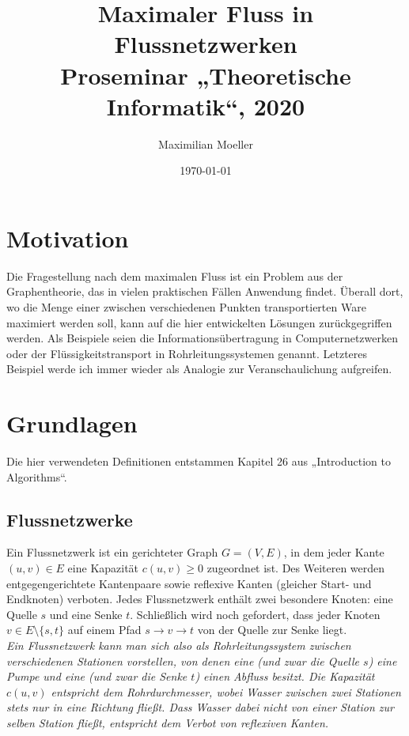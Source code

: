 \documentclass[journal]{IEEEtran}
\author{Maximilian Moeller}
\title{Maximaler Fluss in Flussnetzwerken\\
\large Proseminar „Theoretische Informatik“, 2020}
\date{\today}
\begin{document}
\maketitle

\section{Motivation}
Die Fragestellung nach dem maximalen Fluss ist ein Problem aus der Graphentheorie, das
in vielen praktischen Fällen Anwendung findet. Überall dort, wo die Menge einer zwischen verschiedenen Punkten transportierten Ware maximiert werden soll, kann auf die hier entwickelten Lösungen zurückgegriffen werden. Als Beispiele seien die Informationsübertragung in Computernetzwerken oder der Flüssigkeitstransport in Rohrleitungssystemen genannt. Letzteres Beispiel werde ich immer wieder als Analogie zur Veranschaulichung aufgreifen.

\section{Grundlagen}
Die hier verwendeten Definitionen entstammen Kapitel 26 aus „Introduction to Algorithms“\citep{Cormen09}.
\subsection{Flussnetzwerke}
Ein Flussnetzwerk ist ein gerichteter Graph $G = (V,E)$, in dem jeder Kante $(u,v) \in E$ eine Kapazität $c(u,v) \geq 0$ zugeordnet ist. Des Weiteren werden entgegengerichtete Kantenpaare sowie reflexive Kanten (gleicher Start- und Endknoten) verboten. Jedes Flussnetzwerk enthält zwei besondere Knoten: eine Quelle $s$ und eine Senke $t$. Schließlich wird noch gefordert, dass jeder Knoten $v \in E\setminus\{s,t\}$ auf einem Pfad $s\to v\to t$ von der Quelle zur Senke liegt.\\
\textit{Ein Flussnetzwerk kann man sich also als Rohrleitungssystem zwischen verschiedenen Stationen vorstellen, von denen eine (und zwar die Quelle $s$) eine Pumpe und eine (und zwar die Senke $t$) einen Abfluss besitzt.
Die Kapazität $c(u,v)$ entspricht dem Rohrdurchmesser, wobei Wasser zwischen zwei Stationen stets nur in eine Richtung fließt. Dass Wasser dabei nicht von einer Station zur selben Station fließt, entspricht dem Verbot von reflexiven Kanten.}
\end{document}
